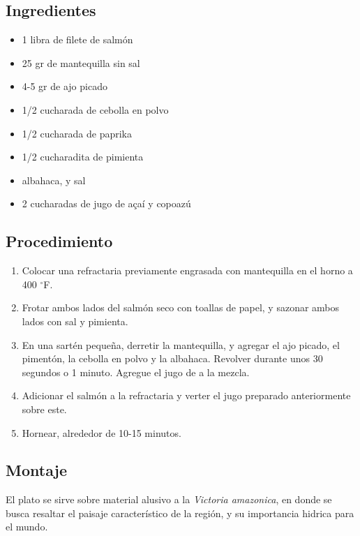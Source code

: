 \documentclass{scrartcl}
\begin{document}
	\subsection{Ingredientes}
	\begin{multicols}{2}
		\begin{itemize}
			\item 1 libra de filete de salmón
			\item 25 gr de mantequilla sin sal
			\item 4-5 gr de ajo picado
			\item 1/2 cucharada de cebolla en polvo
			\item 1/2 cucharada de paprika
			\item 1/2 cucharadita de pimienta
			\item albahaca, y sal
			\item 2 cucharadas de jugo de a\c{c}a\'i y copoazú
		\end{itemize}
	\end{multicols}
	
	\subsection{Procedimiento \cite{salmon}}
	\begin{multicols}{2}
		\begin{enumerate}
			\item Colocar una refractaria previamente engrasada con mantequilla en el horno a 400 $^\circ$F.
			
			\item Frotar ambos lados del salmón seco con toallas de papel, y sazonar ambos lados con sal y pimienta.
			
			\item En una sartén pequeña, derretir la mantequilla, y agregar el ajo picado, el pimentón, la cebolla en polvo y la albahaca. Revolver durante unos 30 segundos o 1 minuto. Agregue el jugo de a la mezcla.
			
			\item Adicionar el salm\'on a la refractaria y verter el jugo preparado anteriormente sobre este.
			
			\item Hornear, alrededor de 10-15 minutos.
		\end{enumerate}
	\end{multicols}

	\subsection{Montaje}
	El plato se sirve sobre material alusivo a la \textit{Victoria amazonica}, en donde se busca resaltar el paisaje característico de la región, y su importancia hidrica para el mundo.
	
\end{document}
